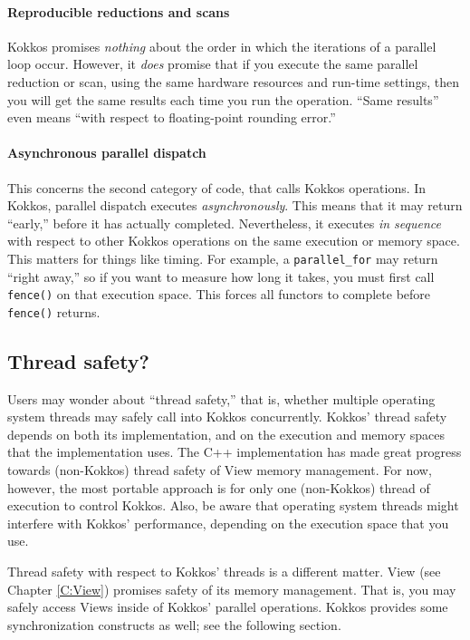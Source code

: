 \paragraph{Reproducible reductions and scans}\label{SS:Model:Exec:Repro}

Kokkos promises \emph{nothing} about the order in which the iterations of a parallel loop occur.
However, it \emph{does} promise that if you execute the same parallel reduction or scan,
using the same hardware resources and run-time settings,
then you will get the same results each time you run the operation.
``Same results'' even means ``with respect to floating-point rounding error.''

\paragraph{Asynchronous parallel dispatch}\label{SS:Model:Exec:Async}

This concerns the second category of code, that calls Kokkos operations.
In Kokkos, parallel dispatch executes \emph{asynchronously}.  
This means that it may return ``early,'' before it has actually completed.
Nevertheless, it executes \emph{in sequence} with respect to other Kokkos operations on the same execution or memory space.
This matters for things like timing.
For example, a \lstinline!parallel_for! may return ``right away,''
so if you want to measure how long it takes,
you must first call \lstinline!fence()! on that execution space.
This forces all functors to complete before \lstinline!fence()! returns.

\subsection{Thread safety?}\label{SS:Model:Exec:ThreadSafety}

Users may wonder about ``thread safety,'' that is,
whether multiple operating system threads may safely call into Kokkos concurrently.
Kokkos' thread safety depends on both its implementation, 
and on the execution and memory spaces that the implementation uses.
The C++ implementation has made great progress towards (non-Kokkos) thread safety of View memory management.
For now, however, the most portable approach is for only one (non-Kokkos) thread of execution to control Kokkos.
Also, be aware that operating system threads might interfere with Kokkos' performance,
depending on the execution space that you use.

Thread safety with respect to Kokkos' threads is a different matter.
View (see Chapter \ref{C:View}) promises safety of its memory management.
That is, you may safely access Views inside of Kokkos' parallel operations.
Kokkos provides some synchronization constructs as well; see the following section.
